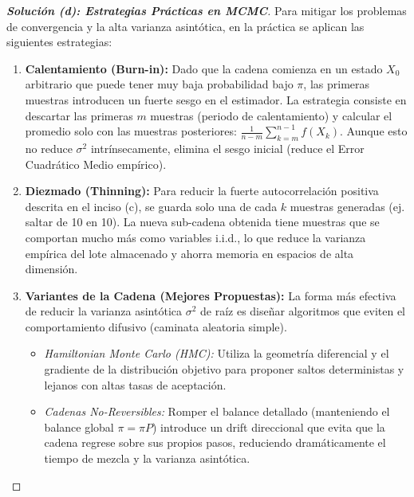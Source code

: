\documentclass[10pt,a4paper]{article}
\begin{document}
\begin{proof}[\textbf{Solución (d): Estrategias Prácticas en MCMC}]
    Para mitigar los problemas de convergencia y la alta varianza asintótica, en la práctica se aplican las siguientes estrategias:
    
    \begin{enumerate}
        \item \textbf{Calentamiento (Burn-in):} 
        Dado que la cadena comienza en un estado $X_0$ arbitrario que puede tener muy baja probabilidad bajo $\pi$, las primeras muestras introducen un fuerte sesgo en el estimador. La estrategia consiste en descartar las primeras $m$ muestras (periodo de calentamiento) y calcular el promedio solo con las muestras posteriores: $\frac{1}{n-m} \sum_{k=m}^{n-1} f(X_k)$. Aunque esto no reduce $\sigma^2$ intrínsecamente, elimina el sesgo inicial (reduce el Error Cuadrático Medio empírico).
        
        \item \textbf{Diezmado (Thinning):}
        Para reducir la fuerte autocorrelación positiva descrita en el inciso (c), se guarda solo una de cada $k$ muestras generadas (ej. saltar de 10 en 10). La nueva sub-cadena obtenida tiene muestras que se comportan mucho más como variables i.i.d., lo que reduce la varianza empírica del lote almacenado y ahorra memoria en espacios de alta dimensión.
        
        \item \textbf{Variantes de la Cadena (Mejores Propuestas):}
        La forma más efectiva de reducir la varianza asintótica $\sigma^2$ de raíz es diseñar algoritmos que eviten el comportamiento difusivo (caminata aleatoria simple). 
        \begin{itemize}
            \item \textit{Hamiltonian Monte Carlo (HMC):} Utiliza la geometría diferencial y el gradiente de la distribución objetivo para proponer saltos deterministas y lejanos con altas tasas de aceptación.
            \item \textit{Cadenas No-Reversibles:} Romper el balance detallado (manteniendo el balance global $\pi = \pi P$) introduce un drift direccional que evita que la cadena regrese sobre sus propios pasos, reduciendo dramáticamente el tiempo de mezcla y la varianza asintótica.
        \end{itemize}
    \end{enumerate}
\end{proof}
\end{document}
